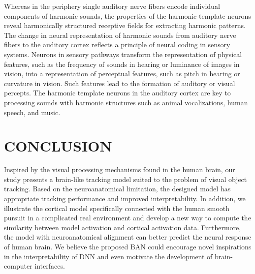 \documentclass[journal]{IEEEtran}
\begin{document}
Whereas in the periphery single auditory nerve fibers encode individual components of harmonic sounds, the properties of the harmonic template neurons reveal harmonically structured receptive fields for extracting harmonic patterns.
The change in neural representation of harmonic sounds from auditory nerve fibers to the auditory cortex reflects a principle of neural coding in sensory systems.
Neurons in sensory pathways transform the representation of physical features, such as the frequency of sounds in hearing or luminance of images in vision, into a representation of perceptual features, such as pitch in hearing or curvature in vision.
Such features lead to the formation of auditory or visual percepts.
The harmonic template neurons in the auditory cortex are key to processing sounds with harmonic structures such as animal vocalizations, human speech, and music.


\section{CONCLUSION}
Inspired by the visual processing mechanisms found in the human brain, our study presents a brain-like tracking model suited to the problem of visual object tracking. 
Based on the neuroanatomical limitation, the designed model has appropriate tracking performance and improved interpretability. 
In addition, we illustrate the cortical model specifically connected with the human smooth pursuit in a complicated real environment 
and develop a new way to compute the similarity between model activation and cortical activation data. 
Furthermore, the model with neuroanatomical alignment can better predict the neural response of human brain. 
We believe the proposed BAN could encourage novel inspirations in the interpretability of DNN 
and even motivate the development of brain-computer interfaces.


%
\end{document}
